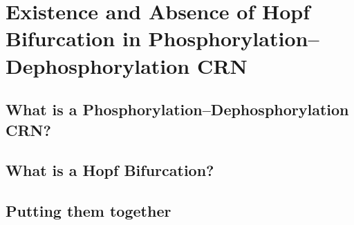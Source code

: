 \chapter{Existence and Absence of Hopf Bifurcation in Phosphorylation–Dephosphorylation CRN}

\section{What is a Phosphorylation–Dephosphorylation CRN?}

\section{What is a Hopf Bifurcation?}

\section{Putting them together}